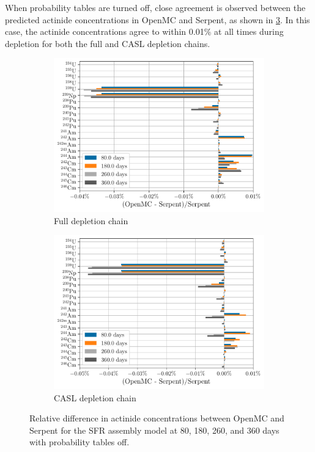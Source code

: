 \documentclass[3p,authoryear]{elsarticle}
\begin{document}
When probability tables are turned off, close agreement is observed between
the predicted actinide concentrations in OpenMC and Serpent, as shown in
\cref{fig:sfr-actinides-nop}. In this case, the actinide concentrations agree to
within 0.01\% at all times during depletion for both the full and CASL depletion
chains.
\begin{figure}[H]
  \centering
  \begin{subfigure}[t]{0.45\textwidth}
    \includegraphics[width=\textwidth]{figures/sfr_actinides_full_nop.pdf}
    \caption{Full depletion chain}
    \label{fig:sfr-actinides-full-nop}
  \end{subfigure}
  \hspace{0.05\textwidth}
  \begin{subfigure}[t]{0.45\textwidth}
    \includegraphics[width=\textwidth]{figures/sfr_actinides_casl_nop.pdf}
    \caption{CASL depletion chain}
    \label{fig:sfr-actinides-casl-nop}
  \end{subfigure}
  \caption{Relative difference in actinide concentrations between OpenMC and
  Serpent for the SFR assembly model at 80, 180, 260, and 360 days with
  probability tables off.}
  \label{fig:sfr-actinides-nop}
\end{figure}
\end{document}
